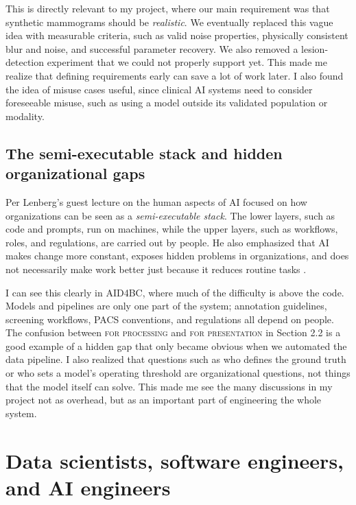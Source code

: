 \documentclass[11pt,a4paper]{article}
\begin{document}
This is directly relevant to my project, where our main requirement was that synthetic mammograms should be \emph{realistic}. We eventually replaced this vague idea with measurable criteria, such as valid noise properties, physically consistent blur and noise, and successful parameter recovery. We also removed a lesion-detection experiment that we could not properly support yet. This made me realize that defining requirements early can save a lot of work later. I also found the idea of misuse cases useful, since clinical AI systems need to consider foreseeable misuse, such as using a model outside its validated population or modality.


\subsection{The semi-executable stack and hidden organizational gaps}

Per Lenberg's guest lecture on the human aspects of AI focused on how organizations can be seen as a \emph{semi-executable stack}. The lower layers, such as code and prompts, run on machines, while the upper layers, such as workflows, roles, and regulations, are carried out by people. He also emphasized that AI makes change more constant, exposes hidden problems in organizations, and does not necessarily make work better just because it reduces routine tasks \cite{coursedecks}.

I can see this clearly in AID4BC, where much of the difficulty is above the code. Models and pipelines are only one part of the system; annotation guidelines, screening workflows, PACS conventions, and regulations all depend on people. The confusion between \textsc{for processing} and \textsc{for presentation} in Section 2.2 is a good example of a hidden gap that only became obvious when we automated the data pipeline. I also realized that questions such as who defines the ground truth or who sets a model's operating threshold are organizational questions, not things that the model itself can solve. This made me see the many discussions in my project not as overhead, but as an important part of engineering the whole system.


\section{Data scientists, software engineers, and AI engineers}
\end{document}
